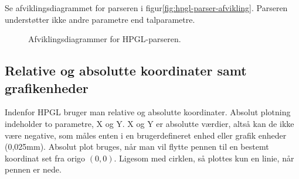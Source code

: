 Se afviklingsdiagrammet for parseren i
figur\vref{fig:hpgl-parser-afvikling}. Parseren understøtter ikke
andre parametre end talparametre.

\begin{figure}[htbp]
  \centering
  \qquad
  \caption{Afviklingsdiagrammer for HPGL-parseren.}
  \label{fig:hpgl-parser-afvikling}
\end{figure}


\subsection{Relative og absolutte koordinater samt grafikenheder}
\label{sc:relativ-absolut}

Indenfor HPGL bruger man relative og absolutte koordinater. Absolut
plotning indeholder to parametre, X og Y. X og Y er absolutte værdier,
altså kan de ikke være negative, som måles enten i en brugerdefineret
enhed eller grafik enheder (0,025mm). Absolut plot bruges, når man vil
flytte pennen til en bestemt koordinat set fra origo $(0, 0)$. Ligesom
med cirklen, så plottes kun en linie, når pennen er nede.


